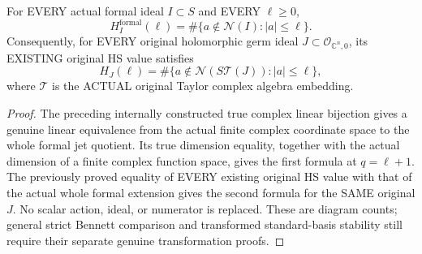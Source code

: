 \begin{theorem}
\label{hir:actual-formal-and-original-hs-standard-monomial-count}
For EVERY actual formal ideal $I\subset S$ and EVERY $\ell\ge0$,
\[
 H^{\mathrm{formal}}_I(\ell)
 =\#\{a\notin\mathcal N(I):|a|\le\ell\}.
\]
Consequently, for EVERY original holomorphic germ ideal $J\subset
\mathcal O_{\mathbb C^n,0}$, its EXISTING original HS value satisfies
\[
 H_J(\ell)=\#\{a\notin\mathcal N(S\mathcal T(J)):|a|\le\ell\},
\]
where $\mathcal T$ is the ACTUAL original Taylor complex algebra embedding.
\leanok
\end{theorem}
\begin{proof}
The preceding internally constructed true complex linear bijection gives
a genuine linear equivalence from the actual finite complex coordinate
space to the whole formal jet quotient. Its true dimension equality,
together with the actual dimension of a finite complex function space,
gives the first formula at $q=\ell+1$. The previously proved equality
of EVERY existing original HS value with that of the actual whole formal
extension gives the second formula for the SAME original $J$. No
scalar action, ideal, or numerator is replaced. These are diagram counts;
general strict Bennett comparison and transformed standard-basis
stability still require their separate genuine transformation proofs.
\end{proof}
